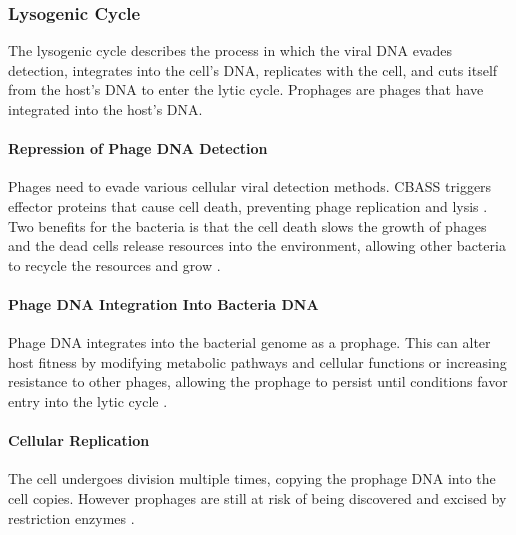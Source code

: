 \subsubsection{Lysogenic Cycle}
The lysogenic cycle describes the process in which the viral DNA evades detection, integrates into the cell's DNA, replicates with the cell, and cuts itself from the host's DNA to enter the lytic cycle. 
Prophages are phages that have integrated into the host's DNA. 

\paragraph{Repression of Phage DNA Detection}
Phages need to evade various cellular viral detection methods. 
CBASS triggers effector proteins that cause cell death, preventing phage replication and lysis \cite{banhBacterialCGASSenses2023}. 
Two benefits for the bacteria is that the cell death slows the growth of phages and the dead cells release resources into the environment, allowing other bacteria to recycle the resources and grow \cite{warwick-dugdaleHosthijackingPlanktonicPiracy2019}. 



\paragraph{Phage DNA Integration Into Bacteria DNA}
Phage DNA integrates into the bacterial genome as a prophage. 
This can alter host fitness by modifying metabolic pathways and cellular functions or increasing resistance to other phages, allowing the prophage to persist until conditions favor entry into the lytic cycle \cite{warwick-dugdaleHosthijackingPlanktonicPiracy2019}.

\paragraph{Cellular Replication}
The cell undergoes division multiple times, copying the prophage DNA into the cell copies. 
However prophages are still at risk of being discovered and excised by restriction enzymes \cite{sharpMolecularEvolutionBacteriophages1986}. 
